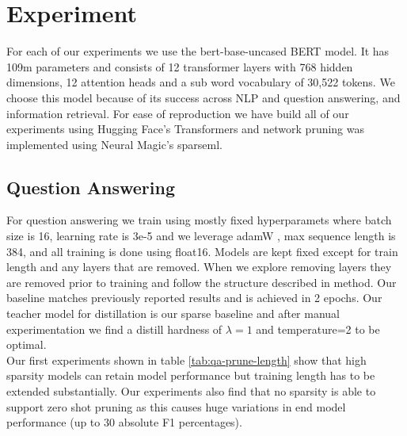\section{Experiment}
For each of our experiments we  use the bert-base-uncased BERT model. It has 109m parameters and consists of 12 transformer layers with 768 hidden dimensions, 12 attention heads and a sub word vocabulary of 30,522 tokens. We choose this model because of its success across NLP and question answering, and information retrieval. For ease of reproduction we have build all of our experiments using Hugging Face's Transformers and network pruning was implemented using Neural Magic's sparseml.
\subsection{Question Answering}
For question answering we train using mostly fixed hyperparamets where batch size is 16, learning rate is 3e-5 and we leverage adamW , max sequence length is 384, and all training is done using float16. Models are kept fixed except for train length and any layers that are removed. When we explore removing layers they are removed prior to training and follow the structure described in method. Our baseline matches previously reported results and is achieved in 2 epochs. Our teacher model for distillation is our sparse baseline and after manual experimentation we find a distill hardness of $\lambda=1$ and temperature=2 to be optimal. \\
Our first experiments shown in table \ref{tab:qa-prune-length} show that high sparsity models can retain model performance but training length has to be extended substantially. Our experiments also find that no sparsity is able to support zero shot pruning as this causes huge variations in end model performance (up to 30 absolute F1 percentages). 
